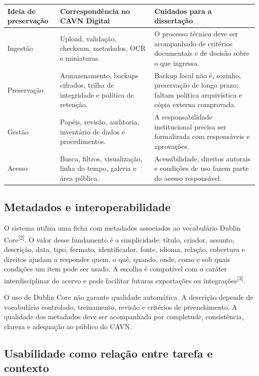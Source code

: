 \documentclass[11pt,a4paper]{article}
\newcommand{\sourcecite}[1]{\textsuperscript{[#1]}}
\begin{document}
\begin{longtable}{P{0.22\textwidth}P{0.37\textwidth}P{0.31\textwidth}}
\toprule
\textbf{Ideia de preservação} & \textbf{Correspondência no CAVN Digital} & \textbf{Cuidados para a dissertação} \\
\midrule
\endhead
\bottomrule
\endfoot
Ingestão & Upload, validação, checksum, metadados, OCR e miniaturas. & O processo técnico deve ser acompanhado de critérios documentais e de decisão sobre o que ingressa. \\
Preservação & Armazenamento, backups cifrados, trilha de integridade e política de retenção. & Backup local não é, sozinho, preservação de longo prazo; faltam política arquivística e cópia externa comprovada. \\
Gestão & Papéis, revisão, auditoria, inventário de dados e procedimentos. & A responsabilidade institucional precisa ser formalizada com responsáveis e aprovações. \\
Acesso & Busca, filtros, visualização, linha do tempo, galeria e área pública. & Acessibilidade, direitos autorais e condições de uso fazem parte do acesso responsável. \\
\end{longtable}

\subsection{Metadados e interoperabilidade}

O sistema utiliza uma ficha com metadados associados ao vocabulário Dublin Core\sourcecite{2}. O valor desse fundamento é a simplicidade: título, criador, assunto, descrição, data, tipo, formato, identificador, fonte, idioma, relação, cobertura e direitos ajudam a responder quem, o quê, quando, onde, como e sob quais condições um item pode ser usado. A escolha é compatível com o caráter interdisciplinar do acervo e pode facilitar futuras exportações ou integrações\sourcecite{3}.

O uso de Dublin Core não garante qualidade automática. A descrição depende de vocabulário controlado, treinamento, revisão e critérios de preenchimento. A qualidade dos metadados deve ser acompanhada por completude, consistência, clareza e adequação ao público do CAVN.

\subsection{Usabilidade como relação entre tarefa e contexto}
\end{document}
